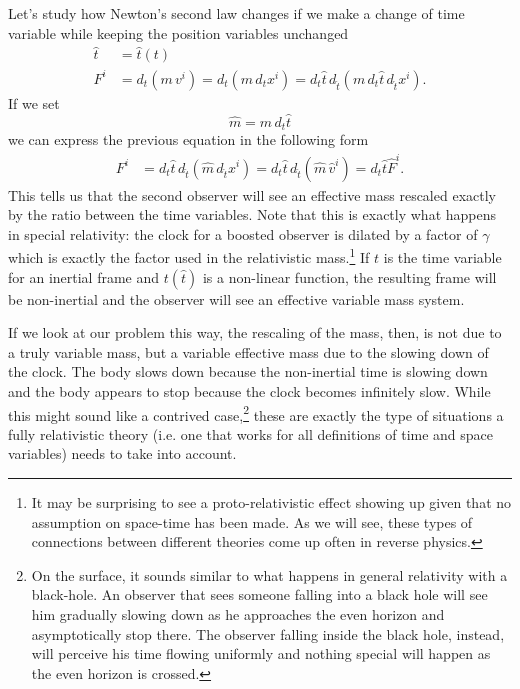 Let's study how Newton's second law changes if we make a change of time variable while keeping the position variables unchanged
\begin{equation}
	\begin{aligned}
		\hat{t}&=\hat{t}(t) \\
		F^i &= d_t  (m \, v^i) = d_t  (m \, d_t x^i) = d_t \hat{t} \, d_{\hat{t}}  (m \, d_t \hat{t} \, d_{\hat{t}} x^i).
	\end{aligned}
\end{equation}
If we set
\begin{equation}
	\hat{m} = m \, d_t \hat{t}
\end{equation}
we can express the previous equation in the following form
\begin{equation}
	\begin{aligned}
		F^i &= d_t \hat{t} \, d_{\hat{t}}  (\hat{m} \, d_{\hat{t}} x^i) = d_t \hat{t} \, d_{\hat{t}}  (\hat{m} \, \hat{v}^i) = d_t \hat{t} \hat{F}^i.
	\end{aligned}
\end{equation}
This tells us that the second observer will see an effective mass rescaled exactly by the ratio between the time variables. Note that this is exactly what happens in special relativity: the clock for a boosted observer is dilated by a factor of $\gamma$ which is exactly the factor used in the relativistic mass.\footnote{It may be surprising to see a proto-relativistic effect showing up given that no assumption on space-time has been made. As we will see, these types of connections between different theories come up often in reverse physics.} If $t$ is the time variable for an inertial frame and $t(\hat{t})$ is a non-linear function, the resulting frame will be non-inertial and the observer will see an effective variable mass system.

If we look at our problem this way, the rescaling of the mass, then, is not due to a truly variable mass, but a variable effective mass due to the slowing down of the clock. The body slows down because the non-inertial time is slowing down and the body appears to stop because the clock becomes infinitely slow. While this might sound like a contrived case,\footnote{On the surface, it sounds similar to what happens in general relativity with a black-hole. An observer that sees someone falling into a black hole will see him gradually slowing down as he approaches the even horizon and asymptotically stop there. The observer falling inside the black hole, instead, will perceive his time flowing uniformly and nothing special will happen as the even horizon is crossed.} these are exactly the type of situations a fully relativistic theory (i.e. one that works for all definitions of time and space variables) needs to take into account.

